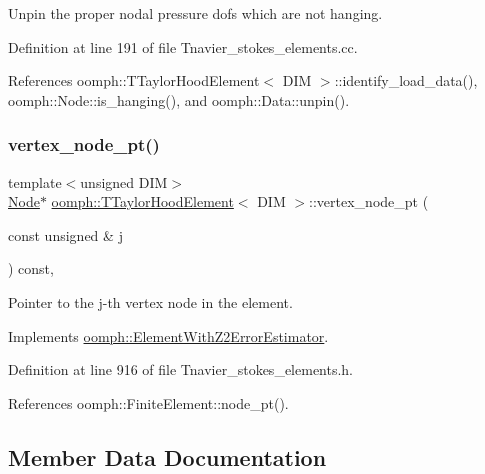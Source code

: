 Unpin the proper nodal pressure dofs which are not hanging. 

Definition at line 191 of file Tnavier\+\_\+stokes\+\_\+elements.\+cc.



References oomph\+::\+T\+Taylor\+Hood\+Element$<$ D\+I\+M $>$\+::identify\+\_\+load\+\_\+data(), oomph\+::\+Node\+::is\+\_\+hanging(), and oomph\+::\+Data\+::unpin().

\mbox{\label{classoomph_1_1TTaylorHoodElement_a3275ab39f68ac0db35dc31bce6b0bdf5}} 
\subsubsection{\texorpdfstring{vertex\+\_\+node\+\_\+pt()}{vertex\_node\_pt()}}
{\footnotesize\ttfamily template$<$unsigned D\+IM$>$ \\
\hyperlink{classoomph_1_1Node}{Node}$\ast$ \hyperlink{classoomph_1_1TTaylorHoodElement}{oomph\+::\+T\+Taylor\+Hood\+Element}$<$ D\+IM $>$\+::vertex\+\_\+node\+\_\+pt (\begin{DoxyParamCaption}\item[{const unsigned \&}]{j }\end{DoxyParamCaption}) const\hspace{0.3cm}{\ttfamily [inline]}, {\ttfamily [virtual]}}



Pointer to the j-\/th vertex node in the element. 



Implements \hyperlink{classoomph_1_1ElementWithZ2ErrorEstimator_a0eedccc33519f852c5dc2055ddf2774b}{oomph\+::\+Element\+With\+Z2\+Error\+Estimator}.



Definition at line 916 of file Tnavier\+\_\+stokes\+\_\+elements.\+h.



References oomph\+::\+Finite\+Element\+::node\+\_\+pt().



\subsection{Member Data Documentation}
\mbox{\label{classoomph_1_1TTaylorHoodElement_a3b1c1055569f41cccf1d9b32a9d20a41}} 
